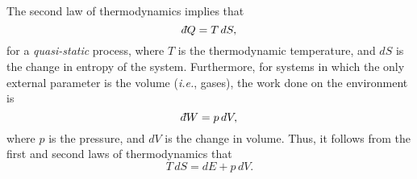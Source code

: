 The second law of thermodynamics implies that
\begin{equation}
\dbar Q = T\,dS,
\end{equation}
for a {\em quasi-static}\/ process,
where $T$ is the thermodynamic temperature, and $dS$ is the change in entropy of
the system. Furthermore, for systems in which the only external parameter is the
volume  ({\em i.e.}, gases),
the work done on the environment is 
\begin{equation}
\dbar W = p\,dV,
\end{equation}
where $p$ is the pressure, and $dV$ is the change in volume. 
Thus, it follows from the first
and second laws of thermodynamics that
\begin{equation}
T\,dS = dE + p\,dV.
\end{equation}

